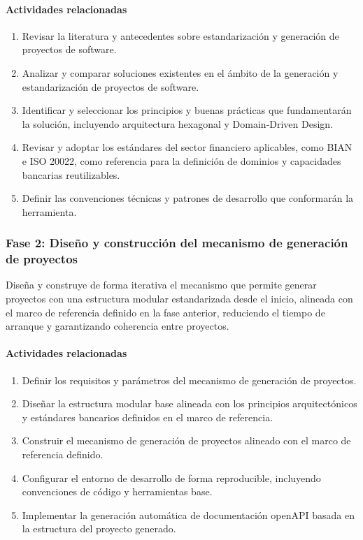 \paragraph*{Actividades relacionadas}

\begin{enumerate}
    \item Revisar la literatura y antecedentes sobre estandarización y generación de proyectos de software.

    \item Analizar y comparar soluciones existentes en el ámbito de la generación y estandarización de proyectos de software.

    \item Identificar y seleccionar los principios y buenas prácticas que fundamentarán la solución, incluyendo arquitectura hexagonal y Domain-Driven Design.

    \item Revisar y adoptar los estándares del sector financiero aplicables, como BIAN e ISO 20022, como referencia para la definición de dominios y capacidades bancarias reutilizables.

    \item Definir las convenciones técnicas y patrones de desarrollo que conformarán la herramienta.
\end{enumerate}

\subsubsection*{Fase 2: Diseño y construcción del mecanismo de generación de proyectos}

Diseña y construye de forma iterativa el mecanismo que permite generar proyectos con una estructura modular estandarizada desde el inicio, alineada con el marco de referencia definido en la fase anterior, reduciendo el tiempo de arranque y garantizando coherencia entre proyectos.

\paragraph*{Actividades relacionadas}

\begin{enumerate}
    \item Definir los requisitos y parámetros del mecanismo de generación de proyectos.

    \item Diseñar la estructura modular base alineada con los principios arquitectónicos y estándares bancarios definidos en el marco de referencia.

    \item Construir el mecanismo de generación de proyectos alineado con el marco de referencia definido.

    \item Configurar el entorno de desarrollo de forma reproducible, incluyendo convenciones de código y herramientas base.

    \item Implementar la generación automática de documentación openAPI basada en la estructura del proyecto generado.
\end{enumerate}

